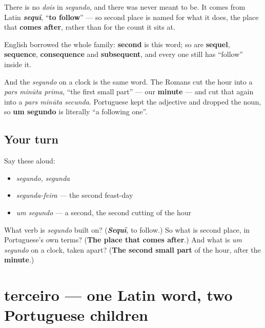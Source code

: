 \begin{cousinweb}
There is no \emph{dois} in \emph{segundo}, and there was never meant to be. It comes from Latin \emph{\textbf{sequī}}, \textquotedblleft{}\textbf{to follow}\textquotedblright{} — so second place is named for what it does, the place that \textbf{comes after}, rather than for the count it sits at.

English borrowed the whole family: \textbf{second} is this word; so are \textbf{sequel}, \textbf{sequence}, \textbf{consequence} and \textbf{subsequent}, and every one still has \textquotedblleft{}follow\textquotedblright{} inside it.

And the \emph{segundo} on a clock is the same word. The Romans cut the hour into a \emph{pars minūta prīma}, \textquotedblleft{}the first small part\textquotedblright{} — our \textbf{minute} — and cut that again into a \emph{pars minūta secunda}. Portuguese kept the adjective and dropped the noun, so \textbf{um segundo} is literally \textquotedblleft{}a following one\textquotedblright{}.
\end{cousinweb}

\subsection*{Your turn}
Say these aloud:

\begin{itemize}
\raggedright
  \item \emph{segundo, segunda}
  \item \emph{segunda-feira} — the second feast-day
  \item \emph{um segundo} — a second, the second cutting of the hour
\end{itemize}

\begin{tcolorbox}[breakable,colback=teal!4,colframe=teal!35!black,title={Before you move on}]
What verb is \emph{segundo} built on? (\emph{\textbf{Sequī}}, to follow.) So what is second place, in Portuguese's own terms? (\textbf{The place that comes after}.) And what is \emph{um segundo} on a clock, taken apart? (\textbf{The second small part} of the hour, after the \textbf{minute}.)
\end{tcolorbox}
\section[terceiro / terceira]{terceiro — one Latin word, two Portuguese children}

